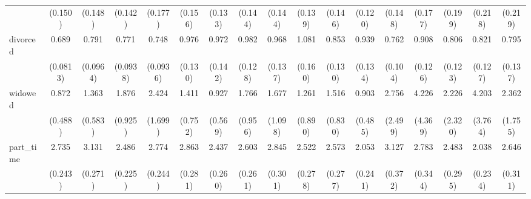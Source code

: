{\begin{tabular}{l*{16}{c}}
                    &     (0.150)         &     (0.148)         &     (0.142)         &     (0.177)         &     (0.156)         &     (0.133)         &     (0.144)         &     (0.144)         &     (0.139)         &     (0.146)         &     (0.120)         &     (0.148)         &     (0.177)         &     (0.199)         &     (0.218)         &     (0.219)         \\
[1em]
divorced            &       0.689\sym{**} &       0.791         &       0.771\sym{*}  &       0.748\sym{*}  &       0.976         &       0.972         &       0.982         &       0.968         &       1.081         &       0.853         &       0.939         &       0.762\sym{*}  &       0.908         &       0.806         &       0.821         &       0.795         \\
                    &    (0.0813)         &    (0.0964)         &    (0.0938)         &    (0.0936)         &     (0.130)         &     (0.142)         &     (0.128)         &     (0.137)         &     (0.160)         &     (0.130)         &     (0.134)         &     (0.104)         &     (0.126)         &     (0.123)         &     (0.127)         &     (0.137)         \\
[1em]
widowed             &       0.872         &       1.363         &       1.876         &       2.424         &       1.411         &       0.927         &       1.766         &       1.677         &       1.261         &       1.516         &       0.903         &       2.756         &       4.226         &       2.226         &       4.203         &       2.362         \\
                    &     (0.488)         &     (0.583)         &     (0.925)         &     (1.699)         &     (0.752)         &     (0.569)         &     (0.956)         &     (1.098)         &     (0.890)         &     (0.830)         &     (0.485)         &     (2.499)         &     (4.369)         &     (2.320)         &     (3.764)         &     (1.755)         \\
[1em]
part\_time           &       2.735\sym{***}&       3.131\sym{***}&       2.486\sym{***}&       2.774\sym{***}&       2.863\sym{***}&       2.437\sym{***}&       2.603\sym{***}&       2.845\sym{***}&       2.522\sym{***}&       2.573\sym{***}&       2.053\sym{***}&       3.127\sym{***}&       2.783\sym{***}&       2.483\sym{***}&       2.038\sym{***}&       2.646\sym{***}\\
                    &     (0.243)         &     (0.271)         &     (0.225)         &     (0.244)         &     (0.281)         &     (0.260)         &     (0.261)         &     (0.301)         &     (0.278)         &     (0.277)         &     (0.241)         &     (0.372)         &     (0.344)         &     (0.295)         &     (0.234)         &     (0.311)         \\

\end{tabular}}
